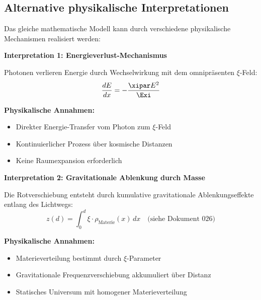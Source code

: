 	\subsection{Alternative physikalische Interpretationen}
	
	Das gleiche mathematische Modell kann durch verschiedene physikalische Mechanismen realisiert werden:
	
	\begin{alternative}
		\textbf{Interpretation 1: Energieverlust-Mechanismus}
		
		Photonen verlieren Energie durch Wechselwirkung mit dem omnipräsenten $\xi$-Feld:
		\begin{equation}
			\frac{dE}{dx} = -\frac{\xipar E^2}{\Exi}
		\end{equation}
		
		\textbf{Physikalische Annahmen:}
		\begin{itemize}
			\item Direkter Energie-Transfer vom Photon zum $\xi$-Feld
			\item Kontinuierlicher Prozess über kosmische Distanzen
			\item Keine Raumexpansion erforderlich
		\end{itemize}
	\end{alternative}
	
	\begin{alternative}
		\textbf{Interpretation 2: Gravitationale Ablenkung durch Masse}
		
		Die Rotverschiebung entsteht durch kumulative gravitationale Ablenkungseffekte entlang des Lichtwegs:
		\begin{equation}
			z(d) = \int_0^d \xi \cdot \rho_{\text{Materie}}(x)\, dx \quad \text{(siehe Dokument~026)}
		\end{equation}
		
		\textbf{Physikalische Annahmen:}
		\begin{itemize}
			\item Materieverteilung bestimmt durch $\xi$-Parameter
			\item Gravitationale Frequenzverschiebung akkumuliert über Distanz
			\item Statisches Universum mit homogener Materieverteilung
		\end{itemize}
	\end{alternative}
	

